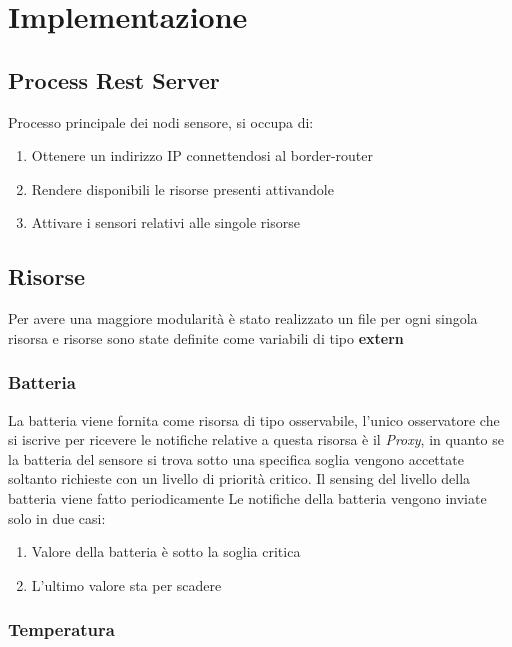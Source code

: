   \section{Implementazione}
    \subsection{Process Rest Server}
      Processo principale dei nodi sensore, si occupa di:
      \begin{enumerate}
        \item Ottenere un indirizzo IP connettendosi al border-router
        \item Rendere disponibili le risorse presenti attivandole
        \item Attivare i sensori relativi alle singole risorse
      \end{enumerate}


      

    \subsection{Risorse}
      Per avere una maggiore modularità è stato realizzato un file per ogni singola risorsa e risorse sono state definite come variabili di tipo \textbf{extern}
      

      \subsubsection{Batteria}
        La batteria viene fornita come risorsa di tipo osservabile, l'unico osservatore che si iscrive per ricevere le notifiche relative a questa risorsa è il \textit{Proxy},
        in quanto se la batteria del sensore si trova sotto una specifica soglia vengono accettate soltanto richieste con un livello di priorità critico.\newline
        Il sensing del livello della batteria viene fatto periodicamente
        Le notifiche della batteria vengono inviate solo in due casi:
        \begin{enumerate}
          \item Valore della batteria è sotto la soglia critica
          \item L'ultimo valore sta per scadere
        \end{enumerate}


      \subsubsection{Temperatura}
